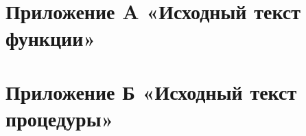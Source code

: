 \section*{Приложение A «Исходный текст функции»}\label{app:A}
\newpage

\section*{Приложение Б «Исходный текст процедуры»}\label{app:B}
\newpage
